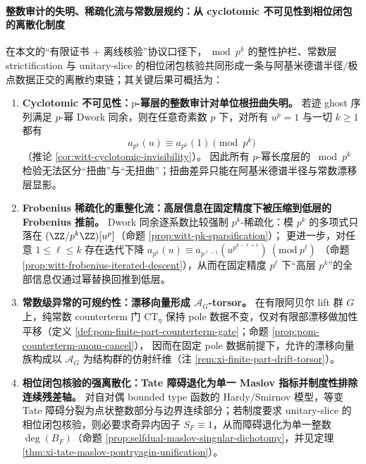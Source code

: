 \paragraph{整数审计的失明、稀疏化流与常数层规约：从 cyclotomic 不可见性到相位闭包的离散化制度}
在本文的“有限证书 + 离线核验”协议口径下，\(\bmod p^k\) 的整性护栏、常数层 strictification 与 unitary-slice 的相位闭包核验共同形成一条与阿基米德谱半径/极点数据正交的离散约束链；其关键后果可概括为：
\begin{enumerate}
  \item \textbf{Cyclotomic 不可见性：\texorpdfstring{$p$}{p}-幂层的整数审计对单位根扭曲失明。}
  若迹 ghost 序列满足 \(p\)-幂 Dwork 同余，则在任意奇素数 \(p\) 下，对所有 \(u^p=1\) 与一切 \(k\ge 1\) 都有
  \[
  a_{p^k}(u)\equiv a_{p^k}(1)\pmod{p^k}
  \]
  （推论 \ref{cor:witt-cyclotomic-invisibility}）。
  因此所有 \(p\)-幂长度层的 \(\bmod p^k\) 检验无法区分“扭曲”与“无扭曲”；扭曲差异只能在阿基米德谱半径与常数漂移层显影。

  \item \textbf{Frobenius 稀疏化的重整化流：高层信息在固定精度下被压缩到低层的 Frobenius 推前。}
  Dwork 同余逐系数比较强制 \(p^k\)-稀疏化：模 \(p^k\) 的多项式只落在 \((\ZZ/p^k\ZZ)[u^p]\)（命题 \ref{prop:witt-pk-sparsification}）；
  更进一步，对任意 \(1\le \ell\le k\) 存在迭代下降
  \(a_{p^k}(u)\equiv a_{p^{\ell-1}}(u^{p^{k-\ell+1}})\ (\mathrm{mod}\ p^\ell)\)
  （命题 \ref{prop:witt-frobenius-iterated-descent}），从而在固定精度 \(p^\ell\) 下“高层 \(p^k\)”的全部信息仅通过幂替换回推到低层。

  \item \textbf{常数级异常的可规约性：漂移向量形成 \texorpdfstring{$\mathcal{A}_G$}{AG}-torsor。}
  在有限阿贝尔 lift 群 \(G\) 上，纯常数 counterterm 门 \(\mathrm{CT}_\eta\) 保持 pole 数据不变，仅对有限部漂移做加性平移（定义 \ref{def:pom-finite-part-counterterm-gate}；命题 \ref{prop:pom-counterterm-anom-cancel}），
  因而在固定 pole 数据前提下，允许的漂移向量族构成以 \(\mathcal{A}_G\) 为结构群的仿射纤维（注 \ref{rem:xi-finite-part-drift-torsor}）。

  \item \textbf{相位闭包核验的强离散化：Tate 障碍退化为单一 Maslov 指标并制度性排除连续残差轴。}
  对自对偶 bounded type 函数的 Hardy/Smirnov 模型，等变 Tate 障碍分裂为点状整数部分与边界连续部分；若制度要求 unitary-slice 的相位闭包核验，则必要求奇异内因子 \(S_F\equiv 1\)，从而障碍退化为单一整数 \(\deg(B_F)\)（命题 \ref{prop:selfdual-maslov-singular-dichotomy}，并见定理 \ref{thm:xi-tate-maslov-pontryagin-unification}）。


\end{enumerate}
